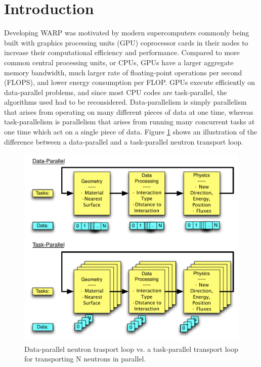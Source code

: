\documentclass[preprint,12pt]{elsarticle}
\begin{document}
\linenumbers


\section{Introduction}
\label{sec:intro}

Developing WARP was motivated by modern supercomputers commonly being built with graphics processing units (GPU) coprocessor cards in their nodes to increase their computational efficiency and performance.  Compared to more common central processing units, or CPUs, GPUs have a larger aggregate memory bandwidth, much larger rate of floating-point operations per second (FLOPS), and lower energy consumption per FLOP.  GPUs execute efficiently on data-parallel problems, and since most CPU codes are task-parallel, the algorithms used had to be reconsidered.  Data-parallelism is simply parallelism that arises from operating on many different pieces of data at one time, whereas task-parallelism is parallelism that arises from running many concurrent tasks at one time which act on a single piece of data.   Figure \ref{datavtask} shows an illustration of the difference between a data-parallel and a task-parallel neutron transport loop.

\begin{figure}[h!] 
  \centering
    \includegraphics[width=\textwidth]{graphics/datavtask.pdf}
     \caption{Data-parallel neutron trasport loop vs. a task-parallel transport loop for transporting N neutrons in parallel.  \label{datavtask} }
\end{figure}
\end{document}

